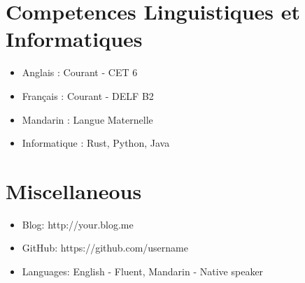 \documentclass{resume}
\begin{document}
\section{Competences Linguistiques et Informatiques}
\begin{itemize}[parsep=0.5ex]
  \item Anglais : Courant - CET 6
  \item Français : Courant - DELF B2
  \item Mandarin : Langue Maternelle
  \item Informatique : Rust, Python, Java
\end{itemize}


\section{Miscellaneous}
\begin{itemize}[parsep=0.5ex]
  \item Blog: http://your.blog.me
  \item GitHub: https://github.com/username
  \item Languages: English - Fluent, Mandarin - Native speaker
\end{itemize}

%
%
\end{document}
